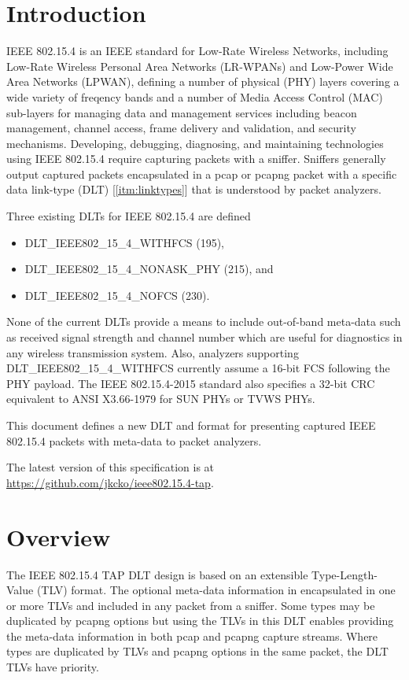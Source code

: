 \documentclass[12pt]{article}
\renewcommand\_{\textunderscore\allowbreak}
\begin{document}
\section{Introduction}\label{sec:intro}
IEEE 802.15.4 is an IEEE standard for Low-Rate Wireless Networks, including
Low-Rate Wireless Personal Area Networks (LR-WPANs) and Low-Power Wide Area
Networks (LPWAN), defining a number of physical (PHY) layers covering a wide
variety of freqency bands and a number of Media Access Control (MAC)
sub-layers for managing data and management services including beacon
management, channel access, frame delivery and validation, and security
mechanisms.  Developing, debugging, diagnosing, and maintaining technologies
using IEEE 802.15.4 require capturing packets with a sniffer. Sniffers
generally output captured packets encapsulated in a pcap or pcapng packet
with a specific data link-type (DLT) [\ref{itm:linktypes}] that is understood
by packet analyzers.

Three existing DLTs for IEEE 802.15.4 are defined

\begin{itemize}
    \item DLT_IEEE802_15_4_WITHFCS (195),
    \item DLT_IEEE802_15_4_NONASK_PHY (215), and
    \item DLT_IEEE802_15_4_NOFCS (230).
\end{itemize}

None of the current DLTs provide a means to include out-of-band meta-data such
as received signal strength and channel number which are useful for
diagnostics in any wireless transmission system.  Also, analyzers supporting
DLT_IEEE802_15_4_WITHFCS currently assume a 16-bit FCS following the PHY
payload.  The IEEE 802.15.4-2015 standard also specifies a 32-bit CRC
equivalent to ANSI X3.66-1979 for SUN PHYs or TVWS PHYs.

This document defines a new DLT and format for presenting captured IEEE
802.15.4 packets with meta-data to packet analyzers.

The latest version of this specification is at
\url{https://github.com/jkcko/ieee802.15.4-tap}.

\newpage
\section{Overview}\label{sec:ovrvw}
The IEEE 802.15.4 TAP DLT design is based on an extensible Type-Length-Value
(TLV) format.  The optional meta-data information in encapsulated in one or
more TLVs and included in any packet from a sniffer.  Some types may be
duplicated by pcapng options but using the TLVs in this DLT enables providing
the meta-data information in both pcap and pcapng capture streams.  Where
types are duplicated by TLVs and pcapng options in the same packet,
the DLT TLVs have priority.
\end{document}
